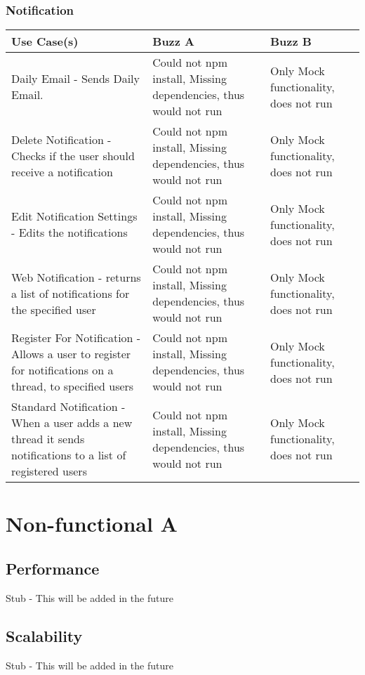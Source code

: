 \documentclass[12pt]{article}
\begin{document}
\subsubsection{Notification}%
\begin{tabular}{|p{4.5cm}|p{4.5cm}|p{4.5cm}|}

\hline
Use Case(s) & Buzz A & Buzz B \\ 
\hline
Daily Email - Sends Daily Email. & Could not npm install, Missing dependencies, thus would not run & Only Mock functionality, does not run \\ %
\hline
Delete Notification - Checks if the user should receive a notification & Could not npm install, Missing dependencies, thus would not run & Only Mock functionality, does not run\\ %
\hline
Edit Notification Settings - Edits the notifications  & Could not npm install, Missing dependencies, thus would not run & Only Mock functionality, does not run\\ %
\hline
Web Notification - returns a list of notifications for the specified user & Could not npm install, Missing dependencies, thus would not run & Only Mock functionality, does not run \\ %
\hline
Register For Notification - Allows a user to register for notifications on a thread, to specified users  & Could not npm install, Missing dependencies, thus would not run & Only Mock functionality, does not run \\ %
\hline
Standard Notification - When a user adds a new thread it sends notifications to a list of registered users & Could not npm install, Missing dependencies, thus would not run &  Only Mock functionality, does not run\\ %
\hline


\end{tabular}
\section{Non-functional A} %
\subsection{Performance}
Stub - This will be added in the future
\subsection{Scalability}
Stub - This will be added in the future
\end{document}
